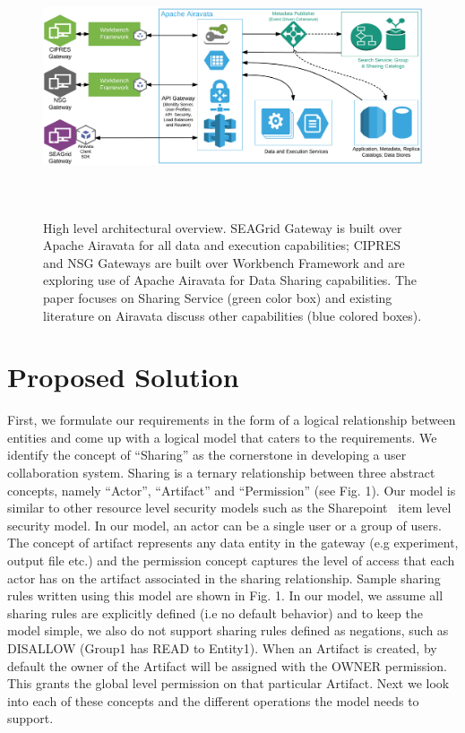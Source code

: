 \documentclass[sigconf]{acmart}
\begin{document}
\begin{figure}
\includegraphics[height=3in, width=7in]{figures/gateway-integaration-overview.pdf}
\caption{High level architectural overview. SEAGrid Gateway is built over Apache Airavata for all data and execution capabilities; CIPRES and NSG Gateways are built over Workbench Framework and are exploring use of Apache Airavata for Data Sharing capabilities. The paper focuses on Sharing Service (green color box) and existing literature on Airavata discuss other capabilities (blue colored boxes).}
\end{figure}

\section{Proposed Solution}
First, we formulate our requirements in the form of a logical relationship between entities and come up with a logical model that caters to the requirements. We identify the concept of “Sharing” as the cornerstone in developing a user collaboration system. Sharing is a ternary relationship between three abstract concepts, namely ``Actor'', ``Artifact'' and ``Permission'' (see Fig. 1). Our model is similar to other resource level security models such as the Sharepoint~\cite{sharepoint} item level security model. In our model, an actor can be a single user or a group of users. The concept of artifact represents any data entity in the gateway (e.g experiment, output file etc.) and the permission concept captures the level of access that each actor has on the artifact associated in the sharing relationship. Sample sharing rules written using this model are shown in Fig. 1. In our model, we assume all sharing rules are explicitly defined (i.e no default behavior) and to keep the model simple, we also do not support sharing rules defined as negations, such as DISALLOW (Group1 has READ to Entity1). When an Artifact is created, by default the owner of the Artifact will be assigned with the OWNER permission. This grants the global level permission on that particular Artifact. Next we look into each of these concepts and the different operations the model needs to support.
\end{document}
